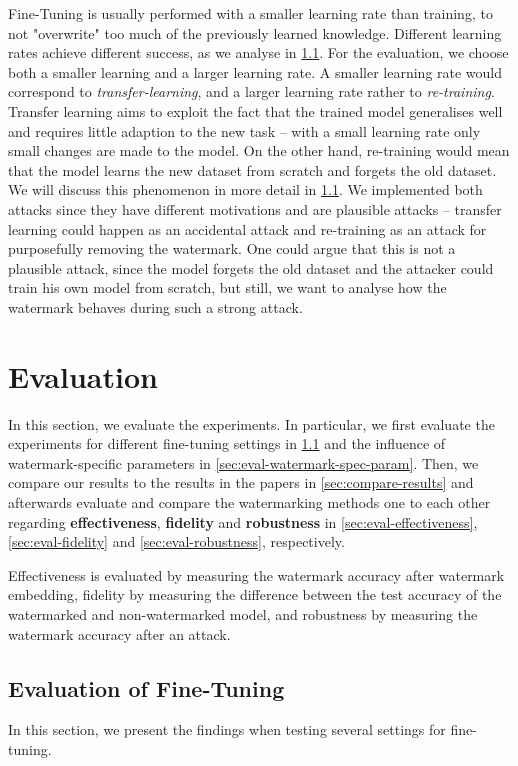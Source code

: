 Fine-Tuning is usually performed with a smaller learning rate than training, to not "overwrite" too much of the previously learned knowledge. Different learning rates achieve different success, as we analyse in \cref{sec:finetuning-experiments}. For the evaluation, we choose both a smaller learning and a larger learning rate. A smaller learning rate would correspond to \textit{transfer-learning}, and a larger learning rate rather to \textit{re-training}. Transfer learning aims to exploit the fact that the trained model generalises well and requires little adaption to the new task -- with a small learning rate only small changes are made to the model. On the other hand, re-training would mean that the model learns the new dataset from scratch and forgets the old dataset. We will discuss this phenomenon in more detail in \cref{sec:finetuning-experiments}. We implemented both attacks since they have different motivations and are plausible attacks -- transfer learning could happen as an accidental attack and re-training as an attack for purposefully removing the watermark. One could argue that this is not a plausible attack, since the model forgets the old dataset and the attacker could train his own model from scratch, but still, we want to analyse how the watermark behaves during such a strong attack.


\section{Evaluation} \label{sec:evaluation}
In this section, we evaluate the experiments. In particular, we first evaluate the experiments for different fine-tuning settings in \cref{sec:finetuning-experiments} and the influence of watermark-specific parameters in \cref{sec:eval-watermark-spec-param}. Then, we compare our results to the results in the papers in \cref{sec:compare-results} and afterwards evaluate and compare the watermarking methods one to each other regarding \textbf{effectiveness}, \textbf{fidelity} and \textbf{robustness} in \cref{sec:eval-effectiveness}, \cref{sec:eval-fidelity} and \cref{sec:eval-robustness}, respectively.

Effectiveness is evaluated by measuring the watermark accuracy after watermark embedding, fidelity by measuring the difference between the test accuracy of the watermarked and non-watermarked model, and robustness by measuring the watermark accuracy after an attack.

\subsection{Evaluation of Fine-Tuning}
\label{sec:finetuning-experiments}
In this section, we present the findings when testing several settings for fine-tuning.

